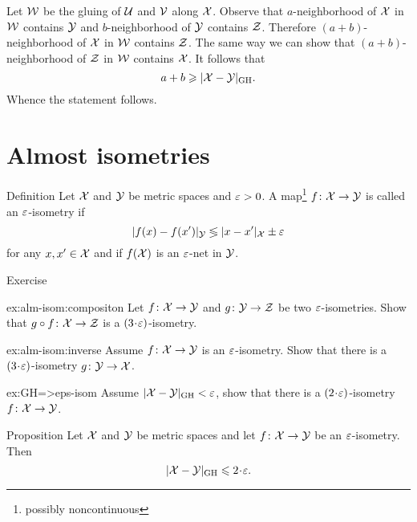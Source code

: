 Let $\mathcal{W}$ be the gluing of $\mathcal{U}$ and $\mathcal{V}$ along $\mathcal{X}$.
Observe that $a$-neighborhood of $\mathcal{X}$ in $\mathcal{W}$ contains $\mathcal{Y}$ and $b$-neighborhood of $\mathcal{Y}$ contains $\mathcal{Z}$.
Therefore $(a+b)$-neighborhood of $\mathcal{X}$ in $\mathcal{W}$ contains $\mathcal{Z}$.
The same way we can show that $(a+b)$-neighborhood of $\mathcal{Z}$ in $\mathcal{W}$ contains $\mathcal{X}$.
It follows that 
$$a+b\geqslant|\mathcal{X}-\mathcal{Y}|_{\operatorname{\rm GH}\nolimits}.$$
Whence the statement follows.
\qeds





\section{Almost isometries}\label{sec:alm-isom}

\begin{thm}{Definition} Let $\mathcal{X}$ and $\mathcal{Y}$ be metric spaces and $\varepsilon > 0$. 
A  map\footnote{possibly noncontinuous} $f\: \spc{X} \z\to \spc{Y}$ is called an $\varepsilon$-isometry 
if 
$$|f(x)-f(x')|_{\mathcal{Y}}\lessgtr |x-x'|_{\mathcal{X}}\pm\varepsilon$$
for any $x,x'\in \mathcal{X}$ 
and if $f(\mathcal{X})$ is an $\varepsilon$-net in $\mathcal{Y}$.
\end{thm}

\begin{thm}{Exercise}\label{ex:alm-isom}

\begin{subthm}{ex:alm-isom:compositon}
Let $f\colon\mathcal{X}\to \mathcal{Y}$ and $g\colon\mathcal{Y}\to \mathcal{Z}$ be two $\varepsilon$-isometries.
Show that $g\circ f\colon \mathcal{X}\to \mathcal{Z}$ is a $(3\cdot\eps)$-isometry.
\end{subthm}

\begin{subthm}{ex:alm-isom:inverse}
Assume $f\: \spc{X} \z\to \spc{Y}$ is an $\varepsilon$-isometry.
Show that there is a $(3\cdot\eps)$-isometry 
$g\colon \mathcal{Y}\to \mathcal{X}$.
\end{subthm}

\begin{subthm}{ex:GH=>eps-isom}
 Assume $|\mathcal{X}-\mathcal{Y}|_{\operatorname{\rm GH}\nolimits}<\varepsilon$, show that there is a $(2\cdot\eps)$-isometry 
$f\colon \mathcal{X}\to \mathcal{Y}$.
\end{subthm}
\end{thm}

\begin{thm}{Proposition}\label{prop:alm-isom=>GH}
Let $\mathcal{X}$ and $\mathcal{Y}$ be metric spaces 
and let $f\colon \mathcal{X}\to \mathcal{Y}$ be an $\varepsilon$-isometry.
Then 
\[|\spc{X}-\spc{Y}|_{\GH}\le 2\cdot \eps.\]
\end{thm}

